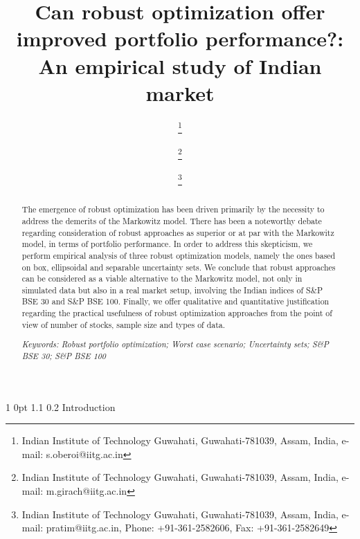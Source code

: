 \documentclass[12pt]{article}
\makeatletter
\numberwithin{equation}{section}
\renewcommand{\section}{
  \@startsection
  {section}%
  {1}%
  {0pt}%
  {1.1\baselineskip}%
  {0.2\baselineskip}%
  {\sc \centering}%
}
\makeatother
\begin{document}
\title{\large\sc Can robust optimization offer improved portfolio performance?: An empirical study of Indian market}
\normalsize
\author{ \thanks{Indian Institute of Technology Guwahati, Guwahati-781039, Assam, India, e-mail: s.oberoi@iitg.ac.in}
\and {} \thanks{Indian Institute of Technology Guwahati, Guwahati-781039, Assam, India, e-mail: m.girach@iitg.ac.in}
\and {} \thanks{Indian Institute of Technology Guwahati, Guwahati-781039, Assam, India, e-mail: pratim@iitg.ac.in,
Phone: +91-361-2582606, Fax: +91-361-2582649}}
\date{}
\maketitle
\begin{abstract}

The emergence of robust optimization has been driven primarily by the necessity to address the demerits of the Markowitz model. There has been a noteworthy debate regarding consideration of robust approaches as superior or at par with the Markowitz model, in terms of portfolio performance. In order to address this skepticism, we perform empirical analysis of three robust optimization models, namely the ones based on box, ellipsoidal and separable uncertainty sets. We conclude that robust approaches can be considered as a viable alternative to the Markowitz model, not only in simulated data but also in a real market setup, involving the Indian indices of S\&P BSE 30 and S\&P BSE 100. Finally, we offer qualitative and quantitative justification regarding the practical usefulness of robust optimization approaches from the point of view of number of stocks, sample size and types of data.

{\it Keywords: Robust portfolio optimization; Worst case scenario; Uncertainty sets; S\&P BSE 30; S\&P BSE 100}

\end{abstract}

\section{Introduction}
\label{Introduction}
\end{document}
